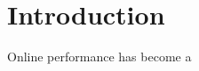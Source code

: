 \documentclass[main]{subfiles}
\begin{document}
\section{Introduction}\label{sec:introduction}

Online performance has become a 
\end{document}
